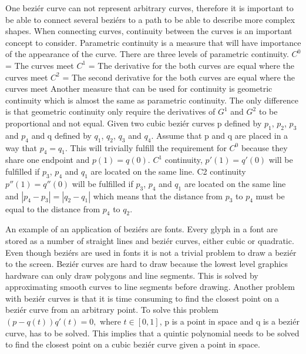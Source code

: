 One beziér curve can not represent arbitrary curves, therefore it is important to be able to connect several beziérs to a path to be able to describe more complex shapes. When connecting curves, continuity between the curves is an important concept to consider. Parametric continuity is a measure that will have importance of the appearance of the curve. There are three levels of parametric continuity.\vspace{\baselineskip}\newline
\begin{math}C^0\end{math} = The curves meet\newline
\begin{math}C^1\end{math} = The derivative for the both curves are equal where the curves meet\newline
\begin{math}C^2\end{math} = The second derivative for the both curves are equal where the curves meet\vspace{\baselineskip} \newline
Another measure that can be used for continuity is geometric continuity which is almost the same as parametric continuity. The only difference is that geometric continuity only require the derivatives of $G^1$ and $G^2$ to be proportional and not equal. Given two cubic beziér curves p defined by $p_1$, $p_2$, $p_3$ and $p_4$ and q defined by $q_1$, $q_2$, $q_3$ and $q_4$. Assume that p and q are placed in a way that $p_4=q_1$. This will trivially fulfill the requirement for $C^0$ because they share one endpoint and $p(1)=q(0)$. $C^1$ continuity, $p'(1)=q'(0)$ will be fulfilled if $p_3$, $p_4$ and $q_1$ are located on the same line. C2 continuity $p''(1)=q''(0)$ will be fulfilled if  $p_3$, $p_4$ and $q_1$ are located on the same line and $|p_4 - p_3| = |q_2 - q_1|$ which means that the distance from $p_3$ to $p_4$ must be equal to the distance from $p_4$ to $q_2$.\citep{PFNP}

An example of an application of beziérs are fonts. Every glyph in a font are stored as a number of straight lines and beziér curves, either cubic or quadratic.\citep{phinney2001} Even though beziérs are used in fonts it is not a trivial problem to draw a beziér to the screen. Beziér curves are hard to draw because the lowest level graphics hardware can only draw polygons and line segments. This is solved by approximating smooth curves to line segments before drawing\citep{shreiner2009opengl}. Another problem with beziér curves is that it is time consuming to find the closest point on a beziér curve from an arbitrary point. To solve this problem $(p-q(t))q'(t)=0,$ where $t\in[0, 1] $, p is a point in space and q is a beziér curve, has to be solved\citep{xiaodiao}. This implies that a quintic polynomial needs to be solved to find the closest point on a cubic beziér curve given a point in space. 


